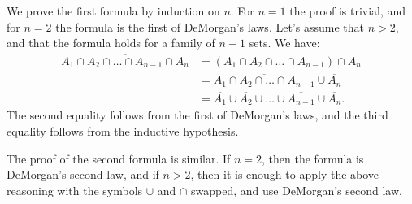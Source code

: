 We prove the first formula by induction on $n$.
For $n=1$ the proof is trivial, and for $n=2$ the formula is the first of DeMorgan's laws.
Let's assume that $n>2$, and that the formula holds for a family of $n-1$ sets.
We have:
\begin{align*}
    \overline{A_1\cap A_2\cap\dots\cap A_{n-1}\cap A_n} &= \overline{(A_1\cap A_2\cap\dots\cap A_{n-1})\cap A_n} \\
    &= \overline{A_1\cap A_2\cap\dots\cap A_{n-1}}\cup\overline{A_n} \\
    &= \overline{A_1}\cup\overline{A_2}\cup\dots\cup\overline{A_{n-1}}\cup\overline{A_n}.
\end{align*}
The second equality follows from the first of DeMorgan's laws, and the third equality follows from the inductive hypothesis.

The proof of the second formula is similar.
If $n=2$, then the formula is DeMorgan's second law, and if $n>2$, then it is enough to apply the above reasoning with the symbols $\cup$ and $\cap$ swapped, and use DeMorgan's second law.
